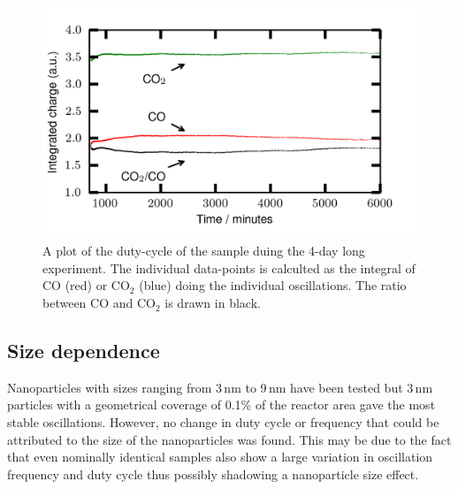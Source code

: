 \documentclass[journal=jacsat,manuscript=article]{achemso}
\begin{document}
\begin{figure}
  \includegraphics[width=12cm]{duty_cycles_long_measurement_supplemental.png}
  \caption{A plot of the duty-cycle of the sample duing the 4-day long
  experiment. The individual data-points is calculted as the integral of CO
  (red) or CO$_2$ (blue) doing the individual oscillations. The ratio between
  CO and CO$_2$ is drawn in black.} \label{fgr:duty_cycles_supplemental}
\end{figure}

\subsection{Size dependence}
Nanoparticles with sizes ranging from 3\,nm to 9\,nm have been tested but 3\,nm
particles with a geometrical coverage of 0.1\% of the reactor area gave the
most stable oscillations. 
However, no change in duty cycle or frequency that could be
attributed to the size of the nanoparticles was found. This may be due to the
fact that even nominally identical samples also show a large variation in
oscillation frequency and duty cycle thus possibly shadowing a nanoparticle
size effect.
\end{document}
